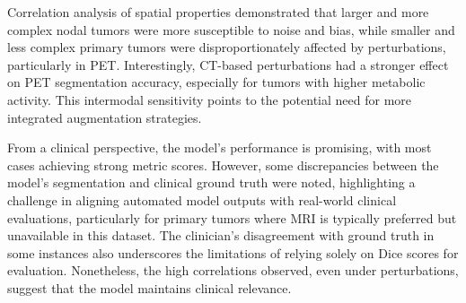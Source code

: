 Correlation analysis of spatial properties demonstrated that larger and more complex nodal tumors were more susceptible to noise and bias, while smaller and less complex primary tumors were disproportionately affected by perturbations, particularly in PET. Interestingly, CT-based perturbations had a stronger effect on PET segmentation accuracy, especially for tumors with higher metabolic activity. This intermodal sensitivity points to the potential need for more integrated augmentation strategies.

From a clinical perspective, the model’s performance is promising, with most cases achieving strong metric scores. However, some discrepancies between the model's segmentation and clinical ground truth were noted, highlighting a challenge in aligning automated model outputs with real-world clinical evaluations, particularly for primary tumors where MRI is typically preferred but unavailable in this dataset. The clinician's disagreement with ground truth in some instances also underscores the limitations of relying solely on Dice scores for evaluation. Nonetheless, the high correlations observed, even under perturbations, suggest that the model maintains clinical relevance.

\endinput